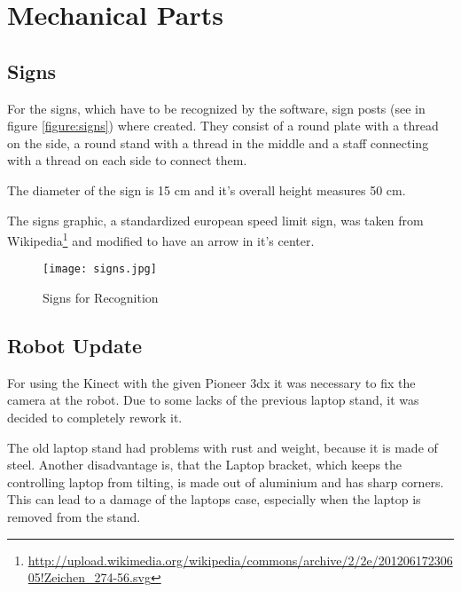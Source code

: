 \chapter{Mechanical Parts}
\graphicspath{{./Mechanical/img/}}



\section{Signs}

For the signs, which have to be recognized by the software, sign posts (see in figure \vref{figure:signs}) where created.
They consist of a round plate with a thread on the side, a round stand with a thread in the middle and a staff connecting
with a thread on each side to connect them.

The diameter of the sign is 15 cm and it's overall height measures 50 cm.

The signs graphic, a standardized european speed limit sign, was taken from 
Wikipedia\footnote{\url{http://upload.wikimedia.org/wikipedia/commons/archive/2/2e/20120617230605!Zeichen_274-56.svg}}
and modified to have an arrow in it's center. 

 \begin{figure}[htp]
\begin{center}
  \texttt{[image: signs.jpg]}
  \caption{Signs for Recognition}
  \label{figure:signs}
\end{center}
\end{figure}

\section{Robot Update}

For using the Kinect with the given Pioneer 3dx it was necessary to fix the camera at the robot.
Due to some lacks of the previous laptop stand, it was decided to completely rework it.

The old laptop stand had problems with rust and weight,
because it is made of steel. Another disadvantage is, that the Laptop bracket, which keeps the 
controlling laptop from tilting, is made out of aluminium and has sharp corners. This can lead
to a damage of the laptops case, especially when the laptop is removed from the stand. 

